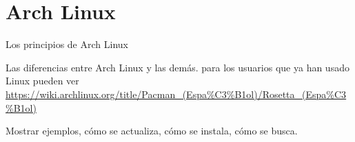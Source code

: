 
\section{Arch Linux}


Los principios de Arch Linux

Las diferencias entre Arch Linux y las demás.
para los usuarios que ya han usado Linux pueden ver \url{https://wiki.archlinux.org/title/Pacman_(Espa%C3%B1ol)/Rosetta_(Espa%C3%B1ol)}

Mostrar ejemplos, cómo se actualiza, cómo se instala, cómo se busca.

